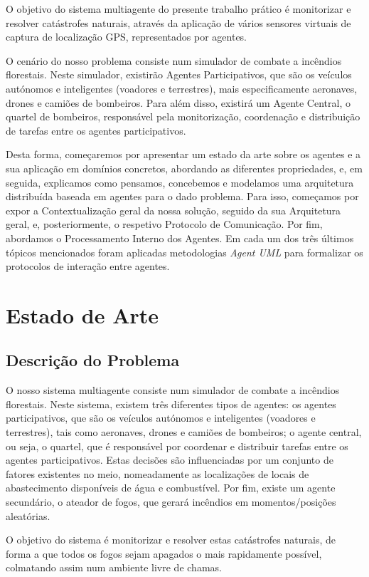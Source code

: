 \documentclass[a4paper]{article}
\begin{document}
O objetivo do sistema multiagente do presente trabalho prático é monitorizar e resolver catástrofes naturais, através da aplicação de vários sensores virtuais de captura de localização GPS, representados por agentes.

O cenário do nosso problema consiste num simulador de combate a incêndios florestais. Neste simulador, existirão Agentes Participativos, que são os veículos autónomos e inteligentes (voadores e terrestres), mais especificamente aeronaves, drones e camiões de bombeiros. Para além disso, existirá um Agente Central, o quartel de bombeiros, responsável pela monitorização, coordenação e distribuição de tarefas entre os agentes participativos.

Desta forma, começaremos por apresentar um estado da arte sobre os agentes e a sua aplicação em domínios concretos, abordando as diferentes propriedades, e, em seguida, explicamos como pensamos, concebemos e modelamos uma arquitetura distribuída baseada em agentes para o dado problema. Para isso, começamos por expor a Contextualização geral da nossa solução, seguido da sua Arquitetura geral, e, posteriormente, o respetivo Protocolo de Comunicação. Por fim, abordamos o Processamento Interno dos Agentes. Em cada um dos três últimos tópicos mencionados foram aplicadas metodologias \textit{Agent UML} para formalizar os protocolos de interação entre agentes.

\section{Estado de Arte}
\subsection{Descrição do Problema}
O nosso sistema multiagente consiste num simulador de combate a incêndios florestais. Neste sistema, existem três diferentes tipos de agentes: os agentes participativos, que são os veículos autónomos e inteligentes (voadores e terrestres), tais como aeronaves, drones e camiões de bombeiros; o agente central, ou seja, o quartel, que é responsável por coordenar e distribuir tarefas entre os agentes participativos. Estas decisões são influenciadas por um conjunto de fatores existentes no meio, nomeadamente as localizações de locais de abastecimento disponíveis de água e combustível. Por fim, existe um agente secundário, o ateador de fogos, que gerará incêndios em momentos/posições aleatórias.

O objetivo do sistema é monitorizar e resolver estas catástrofes naturais, de forma a que todos os fogos sejam apagados o mais rapidamente possível, colmatando assim num ambiente livre de chamas.
\end{document}
